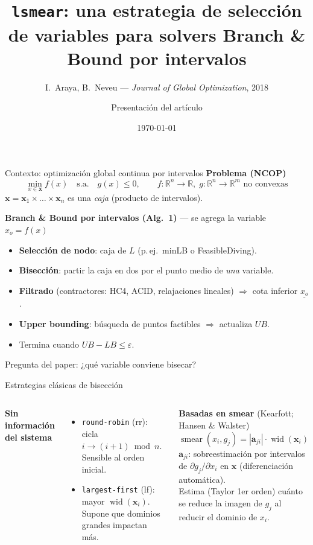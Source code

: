 \documentclass[10pt,aspectratio=169]{beamer}
\title{\texttt{lsmear}: una estrategia de selección de variables para solvers Branch \& Bound por intervalos}
\subtitle{I.~Araya, B.~Neveu --- \emph{Journal of Global Optimization}, 2018}
\author{Presentación del artículo}
\date{\today}
\newcommand{\intv}[1]{\mathbf{#1}}
\newcommand{\wid}{\operatorname{wid}}
\newcommand{\smear}{\operatorname{smear}}
\begin{document}
\maketitle

\begin{frame}{Contexto: optimización global continua por intervalos}
\textbf{Problema (NCOP)}
\[
\min_{x\in\intv{x}} f(x)\quad \text{s.a.}\quad g(x)\le 0,
\qquad f:\mathbb{R}^n\to\mathbb{R},\; g:\mathbb{R}^n\to\mathbb{R}^m \text{ no convexas}
\]
$\intv{x}=\intv{x}_1\times\dots\times\intv{x}_n$ es una \emph{caja} (producto de intervalos).

\vspace{1ex}
\textbf{Branch \& Bound por intervalos (Alg.~1)} --- se agrega la variable $x_o = f(x)$
\begin{itemize}
  \item \textbf{Selección de nodo}: caja de $L$ (p.\,ej.\ minLB o FeasibleDiving).
  \item \textbf{Bisección}: partir la caja en dos por el punto medio de \emph{una} variable.
  \item \textbf{Filtrado} (contractores: HC4, ACID, relajaciones lineales) $\Rightarrow$ cota inferior $\underline{x_o}$.
  \item \textbf{Upper bounding}: búsqueda de puntos factibles $\Rightarrow$ actualiza $UB$.
  \item Termina cuando $UB-LB\le\varepsilon$.
\end{itemize}
\alert{Pregunta del paper:} ¿qué variable conviene bisecar?
\end{frame}

\begin{frame}{Estrategias clásicas de bisección}
\begin{columns}[T]
\textbf{Sin información del sistema}
\begin{itemize}
  \item \texttt{round-robin} (rr): cicla $i \to (i+1)\bmod n$. Sensible al orden inicial.
  \item \texttt{largest-first} (lf): mayor $\wid(\intv{x}_i)$. Supone que dominios grandes impactan más.
\end{itemize}
\textbf{Basadas en smear} (Kearfott; Hansen \& Walster)
\[
\smear(x_i,g_j)=|\intv{a}_{ji}|\cdot\wid(\intv{x}_i)
\]
$\intv{a}_{ji}$: sobreestimación por intervalos de $\partial g_j/\partial x_i$ en $\intv{x}$ (diferenciación automática).\\[1ex]
Estima (Taylor 1er orden) cuánto se reduce la imagen de $g_j$ al reducir el dominio de $x_i$.
\end{columns}
\end{frame}
\end{document}
